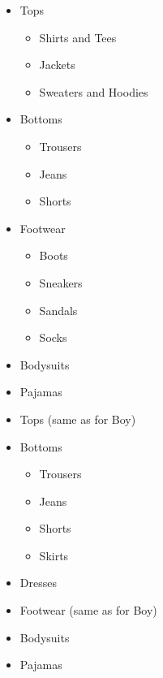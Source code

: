 \begin{itemize}
	 \item Tops
	 	\begin{itemize}
		 \item Shirts and Tees
      	 \item Jackets
      	 \item Sweaters and Hoodies
		\end{itemize}
     \item Bottoms
	 	\begin{itemize}
		 \item Trousers
		 \item Jeans
		 \item Shorts
		\end{itemize}
	 \item Footwear
	 	\begin{itemize}
		 \item Boots
		 \item Sneakers
		 \item Sandals
		 \item Socks
		\end{itemize}
	 \item Bodysuits	
     \item Pajamas
	\end{itemize}
\begin{itemize}
	 \item Tops (same as for Boy)
     \item Bottoms
	 	\begin{itemize}
		 \item Trousers
		 \item Jeans
		 \item Shorts
		 \item Skirts
		\end{itemize}
	 \item Dresses 
	 \item Footwear (same as for Boy)
	 \item Bodysuits	
     \item Pajamas
	\end{itemize}
